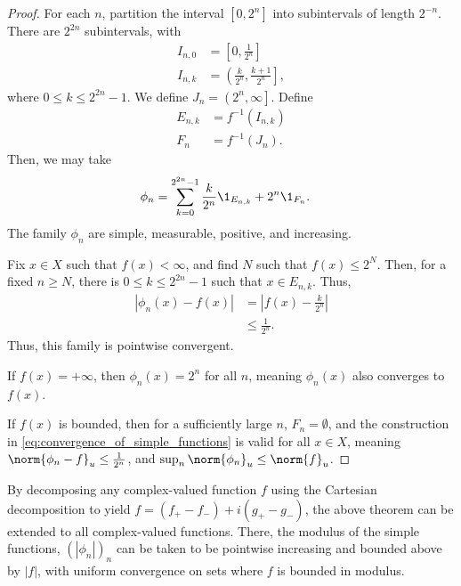 \documentclass[10pt]{mypackage}
\begin{document}
\begin{proof}
  For each $n$, partition the interval $\left[ 0,2^n \right]$ into subintervals of length $2^{-n}$. There are $2^{2n}$ subintervals, with
  \begin{align*}
    I_{n,0} &= \left[ 0,\frac{1}{2^{n}} \right]\\
    I_{n,k} &= \left(\frac{k}{2^{n}},\frac{k + 1}{2^{n}}\right],
  \end{align*}
  where $0 \leq k \leq 2^{2n}-1$. We define $J_n = \left( 2^{n},\infty \right]$. Define
  \begin{align*}
    E_{n,k} &= f^{-1}\left( I_{n,k} \right)\\
    F_n &= f^{-1}\left( J_n \right).
  \end{align*}
  Then, we may take
  \begin{align*}
    \phi_n &= \sum_{k=0}^{2^{2n}-1}\frac{k}{2^{n}}\1_{E_{n,k}} + 2^{n}\1_{F_n}.
  \end{align*}
  The family $\phi_n$ are simple, measurable, positive, and increasing.\newline

  Fix $x\in X$ such that $f(x) < \infty$, and find $N$ such that $f(x) \leq 2^{N}$. Then, for a fixed $n\geq N$, there is $0 \leq k \leq 2^{2n}-1$ such that $x\in E_{n,k}$. Thus,
  \begin{align*}
    \left\vert \phi_n(x) - f(x) \right\vert &= \left\vert f(x) - \frac{k}{2^{n}} \right\vert\label{eq:convergence_of_simple_functions}\tag{$\ast$}\\
                                            &\leq \frac{1}{2^{n}}.
  \end{align*}
  Thus, this family is pointwise convergent.\newline

  If $f(x) = +\infty$, then $\phi_n(x) = 2^{n}$ for all $n$, meaning $\phi_n(x)$ also converges to $f(x)$.\newline

  If $f(x)$ is bounded, then for a sufficiently large $n$, $F_n = \emptyset$, and the construction in \eqref{eq:convergence_of_simple_functions} is valid for all $x\in X$, meaning $\norm{\phi_n - f}_{u} \leq \frac{1}{2^{n}}$, and $\sup_{n}\norm{\phi_n}_{u} \leq \norm{f}_{u}$.
\end{proof}
\begin{remark}
  By decomposing any complex-valued function $f$ using the Cartesian decomposition to yield $f = \left( f_{+} - f_{-} \right) + i\left( g_{+} - g_{-} \right)$, the above theorem can be extended to all complex-valued functions. There, the modulus of the simple functions, $\left( \left\vert \phi_n \right\vert \right)_n$ can be taken to be pointwise increasing and bounded above by $\left\vert f \right\vert$, with uniform convergence on sets where $f$ is bounded in modulus.
\end{remark}
\end{document}
